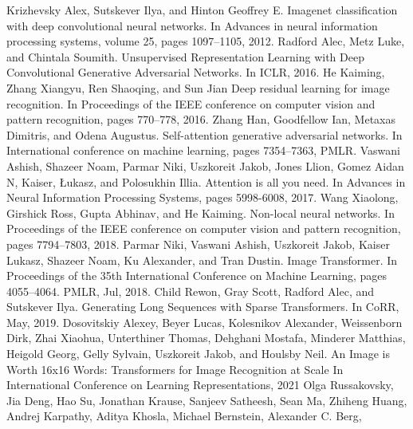 \begin{thebibliography}{9}
  Krizhevsky Alex, Sutskever Ilya, and Hinton Geoffrey E.
  Imagenet classification with deep convolutional neural networks.
  In Advances in neural information processing systems,
  volume 25, pages 1097--1105, 2012.
  Radford Alec, Metz Luke, and Chintala Soumith.
  Unsupervised Representation Learning with Deep Convolutional 
  Generative Adversarial Networks. In ICLR, 2016.
  He Kaiming, Zhang Xiangyu, Ren Shaoqing, and Sun Jian
  Deep residual learning for image recognition.
  In Proceedings of the IEEE conference on computer vision and pattern recognition,
  pages 770--778, 2016.
  Zhang Han, Goodfellow Ian, Metaxas Dimitris, and Odena Augustus.
  Self-attention generative adversarial networks.
  In International conference on machine learning, pages 7354--7363, PMLR.
  Vaswani Ashish, Shazeer Noam, Parmar Niki, Uszkoreit Jakob, Jones Llion, 
  Gomez Aidan N, Kaiser, {\L}ukasz, and Polosukhin Illia.
  Attention is all you need.
  In Advances in Neural Information Processing Systems, pages 5998-6008, 2017.
  Wang Xiaolong, Girshick Ross, Gupta Abhinav, and He Kaiming.
  Non-local neural networks.
  In Proceedings of the IEEE conference on computer vision and pattern recognition,
  pages 7794--7803, 2018.
   Parmar Niki, Vaswani Ashish,
  Uszkoreit Jakob, Kaiser Lukasz, Shazeer Noam, Ku Alexander, and Tran Dustin.
  Image Transformer.
  In Proceedings of the 35th International Conference on Machine Learning,
  pages 4055--4064. PMLR, Jul, 2018.
   Child Rewon, Gray Scott, Radford Alec, 
  and Sutskever Ilya.
  Generating Long Sequences with Sparse Transformers. 
  In CoRR, May, 2019.
  Dosovitskiy Alexey, Beyer Lucas, Kolesnikov Alexander, Weissenborn Dirk, Zhai Xiaohua, 
  Unterthiner Thomas, Dehghani Mostafa, Minderer Matthias, Heigold Georg, Gelly Sylvain, 
  Uszkoreit Jakob, and Houlsby Neil.
  An Image is Worth 16x16 Words: Transformers for Image Recognition at Scale
  In International Conference on Learning Representations, 2021
  Olga Russakovsky, Jia Deng, Hao Su, Jonathan Krause, Sanjeev Satheesh, Sean Ma,
  Zhiheng Huang, Andrej Karpathy, Aditya Khosla, Michael Bernstein, Alexander C. Berg, 

\end{thebibliography}
